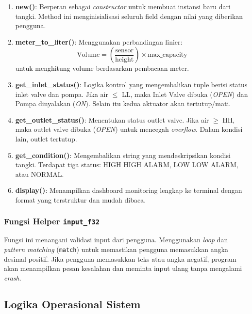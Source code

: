 \documentclass[12pt,a4paper]{article}
\begin{document}
\begin{enumerate}
    \item \textbf{new()}: Berperan sebagai \textit{constructor} untuk membuat instansi baru dari tangki. Method ini menginisialisasi seluruh field dengan nilai yang diberikan pengguna.
    
    \item \textbf{meter\_to\_liter()}: Menggunakan perbandingan linier:
    $$\text{Volume} = \left(\frac{\text{sensor}}{\text{height}}\right) \times \text{max\_capacity}$$
    untuk menghitung volume berdasarkan pembacaan meter.
    
    \item \textbf{get\_inlet\_status()}: Logika kontrol yang mengembalikan tuple berisi status inlet valve dan pompa. Jika air $\leq$ LL, maka Inlet Valve dibuka (\textit{OPEN}) dan Pompa dinyalakan (\textit{ON}). Selain itu kedua aktuator akan tertutup/mati.
    
    \item \textbf{get\_outlet\_status()}: Menentukan status outlet valve. Jika air $\geq$ HH, maka outlet valve dibuka (\textit{OPEN}) untuk mencegah \textit{overflow}. Dalam kondisi lain, outlet tertutup.
    
    \item \textbf{get\_condition()}: Mengembalikan string yang mendeskripsikan kondisi tangki. Terdapat tiga status: HIGH HIGH ALARM, LOW LOW ALARM, atau NORMAL.
    
    \item \textbf{display()}: Menampilkan dashboard monitoring lengkap ke terminal dengan format yang terstruktur dan mudah dibaca.
\end{enumerate}

\subsubsection{Fungsi Helper \texttt{input\_f32}}
Fungsi ini menangani validasi input dari pengguna. Menggunakan \textit{loop} dan \textit{pattern matching} (\texttt{match}) untuk memastikan pengguna memasukkan angka desimal positif. Jika pengguna memasukkan teks atau angka negatif, program akan menampilkan pesan kesalahan dan meminta input ulang tanpa mengalami \textit{crash}.

\subsection{Logika Operasional Sistem}
\end{document}
